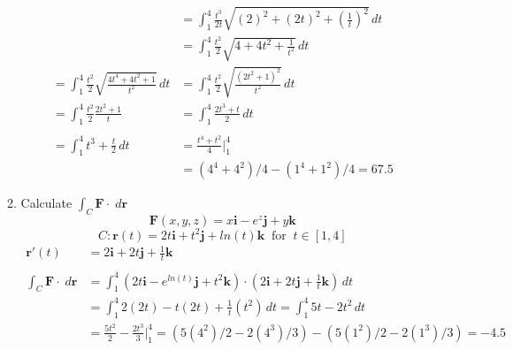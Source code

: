 \documentclass[11pt]{article}
\begin{document}
\begin{preview}
\begin{enumerate}
\begin{enumerate}
\begin{align*}
                                                                                         & = \int_{1}^{4} \frac{t^3}{2t} \sqrt{(2)^{2} + (2t)^2 + \left(\frac{1}{t}\right)^2} \,dt \\
                                                                                         & = \int_{1}^{4} \frac{t^2}{2} \sqrt{4 + 4t^2 + \frac{1}{t^2}} \,dt                       \\
                    = \int_{1}^{4} \frac{t^2}{2} \sqrt{\frac{4t^4 + 4t^2 + 1}{t^2}} \,dt & = \int_{1}^{4} \frac{t^2}{2} \sqrt{\frac{(2t^2 + 1)^{2}}{t^2}} \,dt                     \\
                    = \int_{1}^{4} \frac{t^2}{2} \frac{2t^2 + 1}{t}                      & = \int_{1}^{4} \frac{2t^3 + t}{2} \,dt                                                  \\ \\
                    = \int_{1}^{4} t^3 + \frac{t}{2} \,dt                                & = \frac{t^4 + t^2}{4} \Big|_{1}^{4}                                                     \\
                                                                                         & = (4^4 + 4^2)/4 - (1^4 + 1^2)/4=67.5
                  \end{align*}
            \item Calculate $\int_C \textbf{F} \cdot \; d \textbf{r}$
                  $$ \textbf{F}(x,y,z) = x \textbf{i} - e^{z}\textbf{j} + y \textbf{k} $$
                  $$C: \textbf{r}(t) = 2t \textbf{i} + t^2 \textbf{j} + ln(t) \textbf{k} \;\;\mathrm{for} \;\; t \in [1,4]$$
                  \begin{align*}
                    \textbf{r}'(t)                          & = 2 \textbf{i} + 2t \textbf{j} + \frac{1}{t} \textbf{k}                                                                                                        \\\\
                    \int_C \textbf{F} \cdot \; d \textbf{r} & = \int_{1}^{4} \left(2t \textbf{i} - e^{ln(t)} \textbf{j} + t^2 \textbf{k}\right) \cdot \left(2 \textbf{i} + 2t \textbf{j} + \frac{1}{t} \textbf{k}\right)\,dt \\
                                                            & = \int_{1}^{4} 2(2t) - t(2t) + \frac{1}{t}(t^2) \,dt  = \int_{1}^{4} 5t - 2t^2 \,dt                                                                            \\
                                                            & = \frac{5t^2}{2} - \frac{2t^3}{3} \Big|_{1}^{4} = (5(4^2)/2 - 2(4^3)/3) - (5(1^2)/2 - 2(1^3)/3)=-4.5                                                           \\

\end{align*}
\end{enumerate}
\end{enumerate}
\end{preview}
\end{document}
